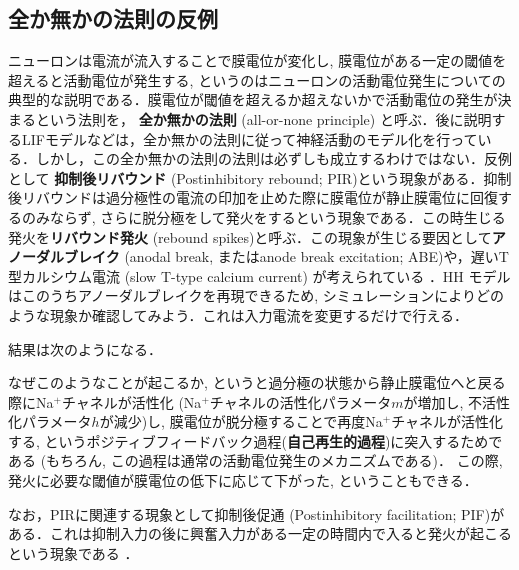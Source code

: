\subsection{全か無かの法則の反例}
ニューロンは電流が流入することで膜電位が変化し, 膜電位がある一定の閾値を超えると活動電位が発生する, というのはニューロンの活動電位発生についての典型的な説明である．膜電位が閾値を超えるか超えないかで活動電位の発生が決まるという法則を， \textbf{全か無かの法則} (all-or-none principle) と呼ぶ．後に説明するLIFモデルなどは，全か無かの法則に従って神経活動のモデル化を行っている．しかし，この全か無かの法則の法則は必ずしも成立するわけではない．反例として \textbf{抑制後リバウンド} (Postinhibitory rebound; PIR)という現象がある．抑制後リバウンドは過分極性の電流の印加を止めた際に膜電位が静止膜電位に回復するのみならず, さらに脱分極をして発火をするという現象である．この時生じる発火を\textbf{リバウンド発火} (rebound spikes)と呼ぶ．この現象が生じる要因として\textbf{アノーダルブレイク} (anodal break, またはanode break excitation; ABE)や，遅いT型カルシウム電流 (slow T-type calcium current) が考えられている \citep{Chik2004-ka}．HH モデルはこのうちアノーダルブレイクを再現できるため, シミュレーションによりどのような現象か確認してみよう．これは入力電流を変更するだけで行える．

結果は次のようになる．


なぜこのようなことが起こるか, というと過分極の状態から静止膜電位へと戻る際にNa$^+$チャネルが活性化 (Na$^+$チャネルの活性化パラメータ$m$が増加し, 不活性化パラメータ$h$が減少)し, 膜電位が脱分極することで再度Na$^+$チャネルが活性化する, というポジティブフィードバック過程(\textbf{自己再生的過程})に突入するためである (もちろん, この過程は通常の活動電位発生のメカニズムである)． この際, 発火に必要な閾値が膜電位の低下に応じて下がった, ということもできる．

なお，PIRに関連する現象として抑制後促通 (Postinhibitory facilitation; PIF)がある．これは抑制入力の後に興奮入力がある一定の時間内で入ると発火が起こるという現象である \citep{Dodla2006-fj} \citep{Dodla2013-dp}．
